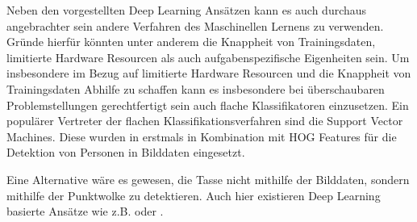 Neben den vorgestellten Deep Learning Ansätzen kann es auch durchaus angebrachter sein andere Verfahren des Maschinellen Lernens zu verwenden. Gründe hierfür könnten unter anderem die Knappheit von Trainingsdaten, limitierte Hardware Resourcen als auch aufgabenspezifische Eigenheiten sein. Um insbesondere im Bezug auf limitierte Hardware Resourcen und die Knappheit von Trainingsdaten Abhilfe zu schaffen kann es insbesondere bei überschaubaren Problemstellungen gerechtfertigt sein auch flache Klassifikatoren einzusetzen. Ein populärer Vertreter der flachen Klassifikationsverfahren sind die Support Vector Machines. Diese wurden in \cite{Dalal.2005} erstmals in Kombination mit HOG Features für die Detektion von Personen in Bilddaten eingesetzt.

Eine Alternative wäre es gewesen, die Tasse nicht mithilfe der Bilddaten, sondern mithilfe der Punktwolke zu detektieren. Auch hier existieren Deep Learning basierte Ansätze wie z.B. \cite{Maturana.2015} oder \cite{Engelcke.20170305}.